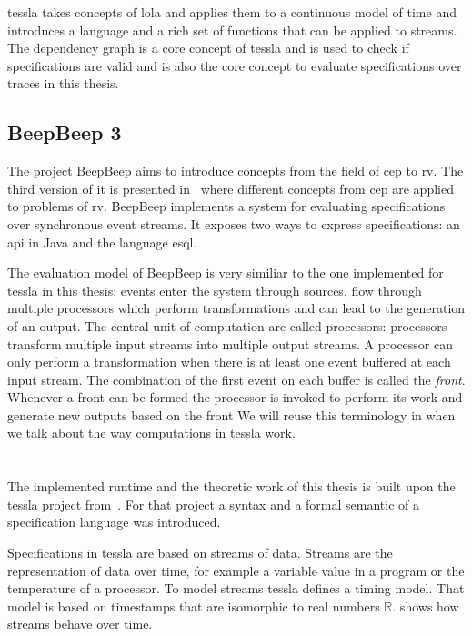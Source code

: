 \gls{tessla} takes concepts of \gls{lola} and applies them to a continuous model of time and introduces a language and a rich set of functions that can be applied to streams.
The dependency graph is a core concept of \gls{tessla} and is used to check if specifications are valid and is also the core concept to evaluate specifications over traces in this thesis.

\subsection{BeepBeep 3}
\label{sec:related:stream_based:beepbeep}

The project BeepBeep aims to introduce concepts from the field of \gls{cep} to \gls{rv}.
The third version of it is presented in~\cite{Hall2011} where different concepts from \gls{cep} are applied to problems of \gls{rv}.
BeepBeep implements a system for evaluating specifications over synchronous event streams.
It exposes two ways to express specifications: an \gls{api} in Java and the language \gls{esql}.

The evaluation model of BeepBeep is very similiar to the one implemented for \gls{tessla} in this thesis: events enter the system through sources, flow through multiple processors which perform transformations and can lead to the generation of an output.
The central unit of computation are called processors: processors transform multiple input streams into multiple output streams.
A processor can only perform a transformation when there is at least one event buffered at each input stream.
The combination of the first event on each buffer is called the \emph{front}.
Whenever a front can be formed the processor is invoked to perform its work and generate new outputs based on the front
We will reuse this terminology in  when we talk about the way computations in \gls{tessla} work.

\section{}
\label{sec:related:tessla}

The implemented runtime and the theoretic work of this thesis is built upon the \gls{tessla} project from~\cite{Decker2016}.
For that project a syntax and a formal semantic of a specification language was introduced.

Specifications in \gls{tessla} are based on streams of data.
Streams are the representation of data over time, for example a variable value in a program or the temperature of a processor.
To model streams \gls{tessla} defines a timing model.
That model is based on timestamps that are isomorphic to real numbers \(\mathbb{R}\).
 shows how streams behave over time.

